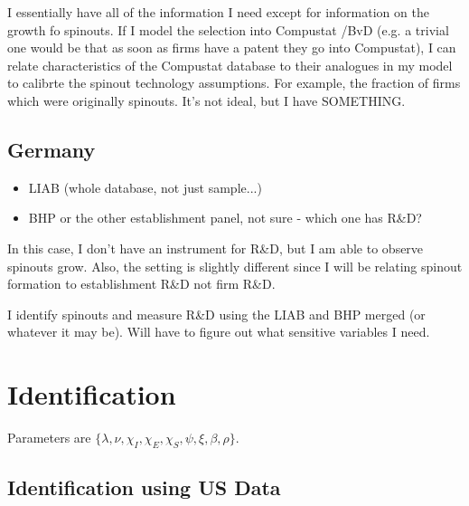 \documentclass[12pt,english]{article}
\theoremstyle{remark}
\begin{document}
I essentially have all of the information I need except for information on the growth fo spinouts. If I model the selection into Compustat /BvD (e.g. a trivial one would be that as soon as firms have a patent they go into Compustat), I can relate characteristics of the Compustat database to their analogues in my model to calibrte the spinout technology assumptions. For example, the fraction of firms which were originally spinouts. It's not ideal, but I have SOMETHING. 

\subsection{Germany}
\begin{itemize}
	\item LIAB (whole database, not just sample...)
	\item BHP or the other establishment panel, not sure - which one has R\&D? 

\end{itemize}

In this case, I don't have an instrument for R\&D, but I am able to observe spinouts grow. Also, the setting is slightly different since I will be relating spinout formation to establishment R\&D not firm R\&D. 

I identify spinouts and measure R\&D using the LIAB and BHP merged (or whatever it may be). Will have to figure out what sensitive variables I need. 

\section{Identification}
Parameters are $\{ \lambda , \nu, \chi_I, \chi_E, \chi_S, \psi, \xi, \beta ,\rho \}$.

\subsection{Identification using US Data}
\end{document}
